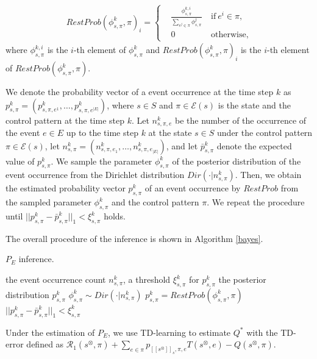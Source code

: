 \documentclass[10 pt, dvipdfmx]{article}
\theoremstyle{definition}
\newcommand{\mysps}{\ensuremath{[\![s^{\otimes}]\!]}_s}
\begin{document}
\begin{align}
  RestProb(\phi^k_{s,\pi},\pi)_i =
  \left\{
  \begin{aligned}
    & \frac{\phi^{k,i}_{s,\pi}}{\sum_{e^j \in \pi} \phi^j_{s,\pi}} \  &\text{if}\ e^i \in \pi,\\
    &0   \ &\text{otherwise},
  \end{aligned}
  \right.
\end{align}
where $\phi^{k,i}_{s,\pi}$ is the $i$-th element of $\phi^k_{s,\pi}$ and $RestProb(\phi^k_{s,\pi},\pi)_i$ is the $i$-th element of $RestProb(\phi^k_{s,\pi},\pi)$.

We denote the probability vector of a event occurrence at the time step $k$ as $p^k_{s,\pi} = (p^k_{s,\pi,e^1}, \ldots, p^k_{s,\pi,e^{|E|}})$, where $s \in S$ and $\pi \in \mathcal{E}(s)$ is the state and the control pattern at the time step $k$. Let $n^k_{s,\pi,e}$ be the number of the occurrence of the event $e \in E$ up to the time step $k$ at the state $s \in S$ under the control pattern $\pi \in \mathcal{E}(s)$, let $n^k_{s,\pi} = (n^k_{s,\pi,e_1}, \ldots, n^k_{s,\pi,e_{|E|}})$, and let $\bar{p}^k_{s,\pi}$ denote the expected value of $p^k_{s,\pi}$. We sample the parameter $\phi^k_{s,\pi}$ of the posterior distribution of the event occurrence from the Dirichlet distribution $Dir(\cdot|n^k_{s,\pi})$. Then, we obtain the estimated probability vector $p^k_{s,\pi}$ of an event occurrence by $RestProb$ from the sampled parameter $\phi^k_{s,\pi}$ and the control pattern $\pi$. We repeat the procedure until $||p^k_{s,\pi} - \bar{p}^k_{s,\pi}||_1 < \xi^k_{s,\pi}$ holds.

The overall procedure of the inference is shown in Algorithm \ref{bayes}.

\begin{algorithm}[H]
 \caption{$P_E$ inference.}
 \begin{algorithmic}[1]
 \renewcommand{\algorithmicrequire}{\textbf{Input:}}
 \renewcommand{\algorithmicensure}{\textbf{Output:}}
 \REQUIRE the event occurrence count $n^k_{s,\pi}$, a threshold $\xi^k_{s,\pi}$ for $p^k_{s,\pi}$
 \ENSURE  the posterior distribution $p^k_{s,\pi}$
  \REPEAT
  \STATE $\phi^k_{s,\pi} \sim Dir(\cdot|n^k_{s,\pi})$
  \STATE $p^k_{s,\pi} = RestProb(\phi^k_{s,\pi},\pi)$
  \UNTIL $||p^k_{s,\pi} - \bar{p}^k_{s,\pi}||_1 < \xi^k_{s,\pi}$
 \end{algorithmic}
 \label{bayes}
 \end{algorithm}

Under the estimation of $P_E$, we use TD-learning to estimate $Q^{\ast}$ with the TD-error defined as $\mathcal{R}_1(s^{\otimes},\pi) + \sum_{e \in \pi} p_{\mysps,\pi,e} T(s^{\otimes},e) - Q(s^{\otimes},\pi)$.
\end{document}
